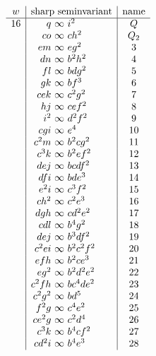 \documentclass[11pt]{article}
\begin{document}
\clearpage
\[
\begin{array}{c|r@{\ }c@{\ }l|c}
w&\multicolumn{3}{c|}{\hbox{sharp seminvariant}}&\hbox{name}\\ \hline
16&q&\infty&i^2&Q\\
&co&\infty&ch^2&Q_2\\
&em&\infty&eg^2&3\\
&dn&\infty&b^2h^2&4\\
&fl&\infty&bdg^2&5\\
&gk&\infty&bf^3&6\\
&cek&\infty&c^2g^2&7\\
&hj&\infty&cef^2&8\\
&i^2&\infty&d^2f^2&9\\
&cgi&\infty&e^4&10\\
&c^2m&\infty&b^2cg^2&11\\
&c^3k&\infty&b^2ef^2&12\\
&dej&\infty&bcdf^2&13\\
&dfi&\infty&bde^3&14\\
&e^2i&\infty&c^3f^2&15\\
&ch^2&\infty&c^2e^3&16\\
&dgh&\infty&cd^2e^2&17\\
&cdl&\infty&b^4g^2&18\\
&dej&\infty&b^3df^2&19\\
&c^2ei&\infty&b^2c^2f^2&20\\
&efh&\infty&b^2ce^3&21\\
&eg^2&\infty&b^2d^2e^2&22\\
&c^2fh&\infty&bc^4de^2&23\\
&c^2g^2&\infty&bd^5&24\\
&f^2g&\infty&c^4e^2&25\\
&ce^2g&\infty&c^2d^4&26\\
&c^3k&\infty&b^4cf^2&27\\
&cd^2i&\infty&b^4e^3&28
\end{array}
\]
\end{document}
